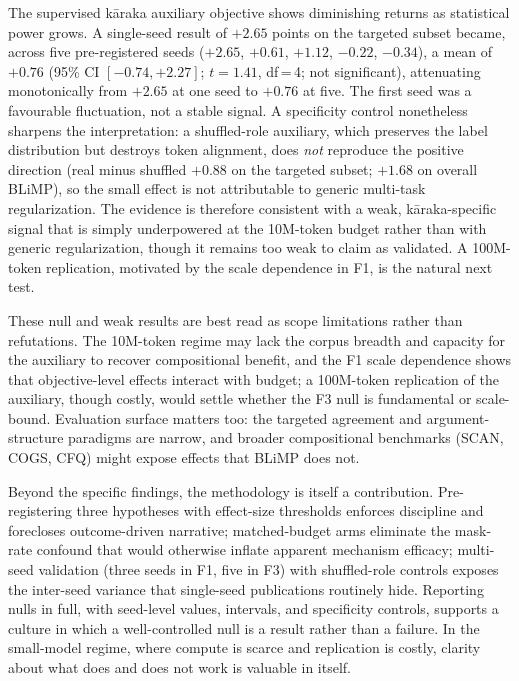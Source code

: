 The supervised kāraka auxiliary objective shows diminishing returns as statistical power grows. A single-seed result of $+2.65$ points on the targeted subset became, across five pre-registered seeds ($+2.65$, $+0.61$, $+1.12$, $-0.22$, $-0.34$), a mean of $+0.76$ (95\% CI $[-0.74, +2.27]$; $t=1.41$, df\,=\,4; not significant), attenuating monotonically from $+2.65$ at one seed to $+0.76$ at five. The first seed was a favourable fluctuation, not a stable signal. A specificity control nonetheless sharpens the interpretation: a shuffled-role auxiliary, which preserves the label distribution but destroys token alignment, does \emph{not} reproduce the positive direction (real minus shuffled $+0.88$ on the targeted subset; $+1.68$ on overall BLiMP), so the small effect is not attributable to generic multi-task regularization. The evidence is therefore consistent with a weak, kāraka-specific signal that is simply underpowered at the 10M-token budget rather than with generic regularization, though it remains too weak to claim as validated. A 100M-token replication, motivated by the scale dependence in F1, is the natural next test.

These null and weak results are best read as scope limitations rather than refutations. The 10M-token regime may lack the corpus breadth and capacity for the auxiliary to recover compositional benefit, and the F1 scale dependence shows that objective-level effects interact with budget; a 100M-token replication of the auxiliary, though costly, would settle whether the F3 null is fundamental or scale-bound. Evaluation surface matters too: the targeted agreement and argument-structure paradigms are narrow, and broader compositional benchmarks (SCAN, COGS, CFQ) might expose effects that BLiMP does not.

Beyond the specific findings, the methodology is itself a contribution. Pre-registering three hypotheses with effect-size thresholds enforces discipline and forecloses outcome-driven narrative; matched-budget arms eliminate the mask-rate confound that would otherwise inflate apparent mechanism efficacy; multi-seed validation (three seeds in F1, five in F3) with shuffled-role controls exposes the inter-seed variance that single-seed publications routinely hide. Reporting nulls in full, with seed-level values, intervals, and specificity controls, supports a culture in which a well-controlled null is a result rather than a failure. In the small-model regime, where compute is scarce and replication is costly, clarity about what does and does not work is valuable in itself.

